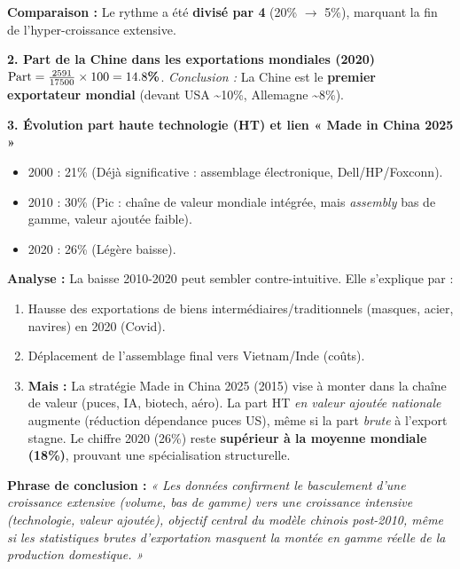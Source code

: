 \documentclass[11pt]{article}
\newcommand{\cle}[1]{{\popxbold\color{popdark}#1}}
\begin{document}
\begin{exoresolu}
\textbf{Comparaison :} Le rythme a été \textbf{divisé par 4} (\num{20}\% $\rightarrow$ \num{5}\%), marquant la fin de l'hyper-croissance extensive.

\textbf{2. Part de la Chine dans les exportations mondiales (2020)}
$\text{Part} = \frac{2591}{17500} \times 100 = \textbf{\num{14,8}\%}$.
\textit{Conclusion :} La Chine est le \textbf{premier exportateur mondial} (devant USA \textasciitilde \num{10}\%, Allemagne \textasciitilde \num{8}\%).

\textbf{3. Évolution part haute technologie (HT) et lien « Made in China 2025 »}
\begin{itemize}
    \item 2000 : \num{21}\% (Déjà significative : assemblage électronique, Dell/HP/Foxconn).
    \item 2010 : \num{30}\% (Pic : chaîne de valeur mondiale intégrée, mais \emph{assembly} bas de gamme, valeur ajoutée faible).
    \item 2020 : \num{26}\% (Légère baisse).
\end{itemize}
\textbf{Analyse :} La baisse 2010-2020 peut sembler contre-intuitive. Elle s'explique par :
\begin{enumerate}
    \item Hausse des exportations de biens intermédiaires/traditionnels (masques, acier, navires) en 2020 (Covid).
    \item Déplacement de l'assemblage final vers Vietnam/Inde (coûts).
    \item \textbf{Mais :} La stratégie \cle{Made in China 2025} (2015) vise à monter dans la chaîne de valeur (puces, IA, biotech, aéro). La part HT \emph{en valeur ajoutée nationale} augmente (réduction dépendance puces US), même si la part \emph{brute} à l'export stagne. Le chiffre 2020 (\num{26}\%) reste \textbf{supérieur à la moyenne mondiale (\num{18}\%)}, prouvant une spécialisation structurelle.
\end{enumerate}

\textbf{Phrase de conclusion :} \emph{« Les données confirment le basculement d'une croissance extensive (volume, bas de gamme) vers une croissance intensive (technologie, valeur ajoutée), objectif central du modèle chinois post-2010, même si les statistiques brutes d'exportation masquent la montée en gamme réelle de la production domestique. »}
\end{exoresolu}
\end{document}
